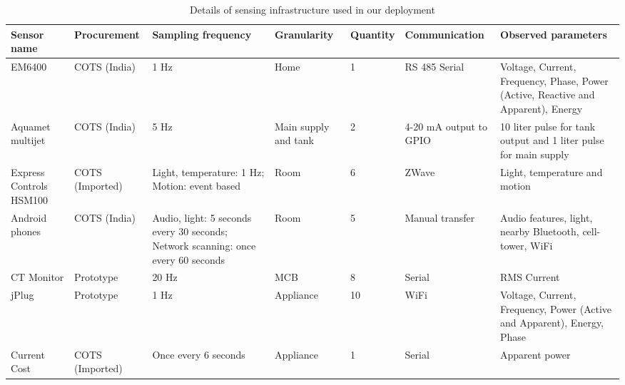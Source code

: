 \documentclass[10pt]{sensys-proc}
\begin{document}
\begin{table}[t!]
\footnotesize
\centering
\vspace{-6mm}
\caption{Details of sensing infrastructure used in our deployment}
\vspace{-4mm}
\label{tab:sensing}
\tabcolsep=0.015cm
\begin{center}
\begin{tabular}{|p{1.7cm}|p{2.0cm}|p{3.3cm}|p{1.5cm}|p{1.5cm}|p{2.0cm}|p{5.2cm}|}
\hline
\textbf{Sensor name} & \textbf{Procurement} & \textbf{Sampling frequency} & \textbf{Granularity} & \textbf{Quantity} & \textbf{Communication} & \textbf{Observed parameters}\\
\hline

EM6400& COTS (India)&1 Hz&Home&1&RS 485 Serial&Voltage, Current, Frequency, Phase, Power (Active, Reactive and Apparent), Energy\\ \hline
Aquamet multijet & COTS (India) &5 Hz&Main supply and tank&2&4-20 mA output to GPIO &10 liter pulse for tank output and 1 liter pulse for main supply\\ \hline
Express Controls HSM100 &COTS (Imported)&Light, temperature: 1 Hz; Motion: event based &Room &6&ZWave&Light, temperature and motion\\ \hline
Android phones &COTS (India) & Audio, light: 5 seconds every 30 seconds; Network scanning: once every 60 seconds&Room&5&Manual transfer&Audio features, light, nearby Bluetooth, cell-tower, WiFi\\ \hline
CT Monitor&Prototype &20 Hz&MCB&8&Serial&RMS Current \\\hline
jPlug& Prototype &1 Hz &Appliance&10&WiFi&Voltage, Current, Frequency, Power (Active and Apparent), Energy, Phase\\ \hline	
Current Cost&COTS (Imported)& Once every 6 seconds &Appliance&1&Serial&Apparent power\\ \hline
\end{tabular}
\end{center}
\vspace{-4mm}
\end{table}
\end{document}
